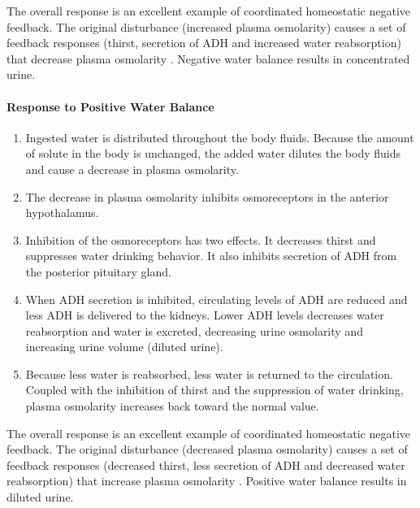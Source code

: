 The overall response is an excellent example of coordinated homeostatic negative feedback.  The original disturbance (increased plasma osmolarity) causes a set of feedback responses (thirst, secretion of ADH and increased water reabsorption) that decrease plasma osmolarity \cite{hall_guyton_2020}. Negative water balance results in concentrated urine.

\paragraph{Response to Positive Water Balance}

\begin{enumerate}
\item  Ingested water is distributed throughout the body fluids. Because the amount of solute in the body is unchanged, the added water dilutes the body fluids and cause a decrease in plasma osmolarity. 
\item The decrease in plasma osmolarity inhibits osmoreceptors in the anterior hypothalamus. 
\item Inhibition of the osmoreceptors has two effects. It decreases thirst and suppresses water drinking behavior. It also inhibits secretion of ADH from the posterior pituitary gland. 
\item When ADH secretion is inhibited, circulating levels of ADH are reduced and less ADH is delivered to the kidneys. Lower ADH levels decreases water reabsorption and water is excreted, decreasing urine osmolarity and increasing urine volume (diluted urine). 
\item Because less water is reabsorbed, less water is returned to the circulation. Coupled with the inhibition of thirst and the suppression of water drinking, plasma osmolarity increases back toward the normal value.
\end{enumerate}

The overall response is an excellent example of coordinated homeostatic negative feedback.  The original disturbance (decreased plasma osmolarity) causes a set of feedback responses (decreased thirst, less secretion of ADH and decreased water reabsorption) that increase plasma osmolarity \cite{hall_guyton_2020}. Positive water balance results in diluted urine.

